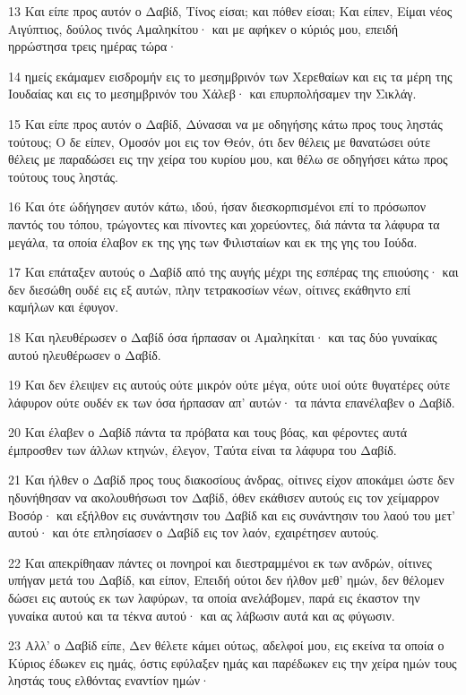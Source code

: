 \par 13 Και είπε προς αυτόν ο Δαβίδ, Τίνος είσαι; και πόθεν είσαι; Και είπεν, Είμαι νέος Αιγύπτιος, δούλος τινός Αμαληκίτου· και με αφήκεν ο κύριός μου, επειδή ηρρώστησα τρεις ημέρας τώρα·
\par 14 ημείς εκάμαμεν εισδρομήν εις το μεσημβρινόν των Χερεθαίων και εις τα μέρη της Ιουδαίας και εις το μεσημβρινόν του Χάλεβ· και επυρπολήσαμεν την Σικλάγ.
\par 15 Και είπε προς αυτόν ο Δαβίδ, Δύνασαι να με οδηγήσης κάτω προς τους ληστάς τούτους; Ο δε είπεν, Ομοσόν μοι εις τον Θεόν, ότι δεν θέλεις με θανατώσει ούτε θέλεις με παραδώσει εις την χείρα του κυρίου μου, και θέλω σε οδηγήσει κάτω προς τούτους τους ληστάς.
\par 16 Και ότε ώδήγησεν αυτόν κάτω, ιδού, ήσαν διεσκορπισμένοι επί το πρόσωπον παντός του τόπου, τρώγοντες και πίνοντες και χορεύοντες, διά πάντα τα λάφυρα τα μεγάλα, τα οποία έλαβον εκ της γης των Φιλισταίων και εκ της γης του Ιούδα.
\par 17 Και επάταξεν αυτούς ο Δαβίδ από της αυγής μέχρι της εσπέρας της επιούσης· και δεν διεσώθη ουδέ εις εξ αυτών, πλην τετρακοσίων νέων, οίτινες εκάθηντο επί καμήλων και έφυγον.
\par 18 Και ηλευθέρωσεν ο Δαβίδ όσα ήρπασαν οι Αμαληκίται· και τας δύο γυναίκας αυτού ηλευθέρωσεν ο Δαβίδ.
\par 19 Και δεν έλειψεν εις αυτούς ούτε μικρόν ούτε μέγα, ούτε υιοί ούτε θυγατέρες ούτε λάφυρον ούτε ουδέν εκ των όσα ήρπασαν απ' αυτών· τα πάντα επανέλαβεν ο Δαβίδ.
\par 20 Και έλαβεν ο Δαβίδ πάντα τα πρόβατα και τους βόας, και φέροντες αυτά έμπροσθεν των άλλων κτηνών, έλεγον, Ταύτα είναι τα λάφυρα του Δαβίδ.
\par 21 Και ήλθεν ο Δαβίδ προς τους διακοσίους άνδρας, οίτινες είχον αποκάμει ώστε δεν ηδυνήθησαν να ακολουθήσωσι τον Δαβίδ, όθεν εκάθισεν αυτούς εις τον χείμαρρον Βοσόρ· και εξήλθον εις συνάντησιν του Δαβίδ και εις συνάντησιν του λαού του μετ' αυτού· και ότε επλησίασεν ο Δαβίδ εις τον λαόν, εχαιρέτησεν αυτούς.
\par 22 Και απεκρίθηααν πάντες οι πονηροί και διεστραμμένοι εκ των ανδρών, οίτινες υπήγαν μετά του Δαβίδ, και είπον, Επειδή ούτοι δεν ήλθον μεθ' ημών, δεν θέλομεν δώσει εις αυτούς εκ των λαφύρων, τα οποία ανελάβομεν, παρά εις έκαστον την γυναίκα αυτού και τα τέκνα αυτού· και ας λάβωσιν αυτά και ας φύγωσιν.
\par 23 Αλλ' ο Δαβίδ είπε, Δεν θέλετε κάμει ούτως, αδελφοί μου, εις εκείνα τα οποία ο Κύριος έδωκεν εις ημάς, όστις εφύλαξεν ημάς και παρέδωκεν εις την χείρα ημών τους ληστάς τους ελθόντας εναντίον ημών·
